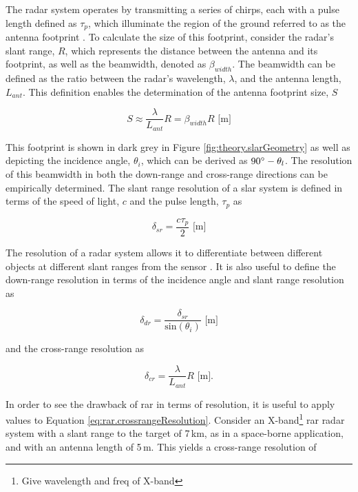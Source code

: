 The radar system operates by transmitting a series of chirps, each with a pulse length defined as $\tau_{p}$, which illuminate the region of the ground referred to as the antenna footprint \cite{Meyer2019}. To calculate the size of this footprint, consider the radar's slant range, $R$, which represents the distance between the antenna and its footprint, as well as the beamwidth, denoted as $\beta_{width}$. The beamwidth can be defined as the ratio between the radar's wavelength, $\lambda$, and the antenna length, $L_{ant}$. This definition enables the determination of the antenna footprint size, $S$ \cite{Meyer2019}

\begin{equation} \label{eq:rar.footprintSize}
    S \approx \frac{\lambda}{L_{ant}}R = \beta_{width} R \,\, \text{[m]}
\end{equation}

This footprint is shown in dark grey in Figure \ref{fig:theory.slarGeometry} as well as depicting the incidence angle, $\theta_{i}$, which can be derived as $90 \degree - \theta_{l}$. The resolution of this beamwidth in both the down-range and cross-range directions can be empirically determined. The slant range resolution of a \ac{slar} system is defined in terms of the speed of light, $c$ and the pulse length, $\tau_{p}$ as

\begin{equation} \label{eq:rar.slantRangeResolution}
    \delta_{sr} = \frac{c \tau_{p}}{2} \,\, \text{[m]}
\end{equation}

The resolution of a radar system allows it to differentiate between different objects at different slant ranges from the sensor \cite{Moreira2013}. It is also useful to define the down-range resolution in terms of the incidence angle and slant range resolution as

\begin{equation} \label{eq:rar.groundRangeResolution}
    \delta_{dr} = \frac{\delta_{sr}}{\text{sin}(\theta_{i})} \,\, \text{[m]}
\end{equation}

and the cross-range resolution as

\begin{equation} \label{eq:rar.crossrangeResolution}
  \delta_{cr} = \frac{\lambda}{L_{ant}}R \,\, \text{[m].}
\end{equation}

In order to see the drawback of \ac{rar} in terms of resolution, it is useful to apply values to Equation \ref{eq:rar.crossrangeResolution}. Consider an X-band\footnote{Give wavelength and freq of X-band} \ac{rar} radar system with a slant range to the target of 7\,km, as in a space-borne application, and with an antenna length of 5\,m. This yields a cross-range resolution of

